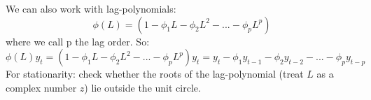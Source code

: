 \begin{enumerate}
\begin{solution}
              We can also work with lag-polynomials:$$ \phi(L) = (1-\phi_1 L-\phi_2 L^2 -... - \phi_p L^p)$$ where we call p the lag order. So:
              $$ \phi(L) y_t = (1-\phi_1 L-\phi_2 L^2 -... - \phi_p L^p)y_t = y_t - \phi_1 y_{t-1} -\phi_2 y_{t-2} - ... - \phi_p y_{t-p}$$
              For stationarity: check whether the roots of the lag-polynomial (treat $L$ as a complex number $z$) lie outside the unit circle.
          \end{solution}
\end{enumerate}
